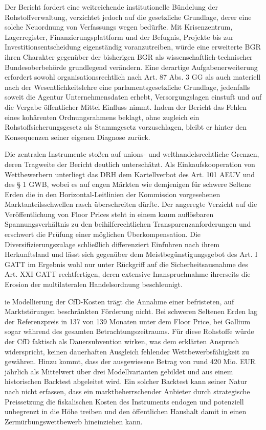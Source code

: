 \documentclass[12pt,a4paper,oneside]{book} %
\begin{document}
{Der Bericht fordert eine weitreichende institutionelle Bündelung der Rohstoffverwaltung, verzichtet jedoch auf die gesetzliche Grundlage, derer eine solche Neuordnung von Verfassungs wegen bedürfte. Mit Krisenzentrum, Lagerregister, Finanzierungsplattform und der Befugnis, Projekte bis zur Investitionsentscheidung eigenständig voranzutreiben, würde eine erweiterte BGR ihren Charakter gegenüber der bisherigen BGR als wissenschaftlich-technischer Bundesoberbehörde grundlegend verändern. Eine derartige Aufgabenerweiterung erfordert sowohl organisationsrechtlich nach Art. 87 Abs. 3 GG als auch materiell nach der Wesentlichkeitslehre eine parlamentsgesetzliche Grundlage, jedenfalls soweit die Agentur Unternehmensdaten erhebt, Versorgungslagen einstuft und auf die Vergabe öffentlicher Mittel Einfluss nimmt. Indem der Bericht das Fehlen eines kohärenten Ordnungsrahmens beklagt, ohne zugleich ein Rohstoffsicherungsgesetz als Stammgesetz vorzuschlagen, bleibt er hinter den Konsequenzen seiner eigenen Diagnose zurück.

Die zentralen Instrumente stoßen auf unions- und welthandelsrechtliche Grenzen, deren Tragweite der Bericht deutlich unterschätzt. Als Einkaufskooperation von Wettbewerbern unterliegt das DRH dem Kartellverbot des Art. 101 AEUV und des § 1 GWB, wobei es auf engen Märkten wie demjenigen für schwere Seltene Erden die in den Horizontal-Leitlinien der Kommission vorgesehenen Marktanteilsschwellen rasch überschreiten dürfte. Der angeregte Verzicht auf die Veröffentlichung von Floor Prices steht in einem kaum auflösbaren Spannungsverhältnis zu den beihilferechtlichen Transparenzanforderungen und erschwert die Prüfung einer möglichen Überkompensation. Die Diversifizierungszulage schließlich differenziert Einfuhren nach ihrem Herkunftsland und lässt sich gegenüber dem Meistbegünstigungsgebot des Art. I GATT im Ergebnis wohl nur unter Rückgriff auf die Sicherheitsausnahme des Art. XXI GATT rechtfertigen, deren extensive Inanspruchnahme ihrerseits die Erosion der multilateralen Handelsordnung beschleunigt.

ie Modellierung der CfD-Kosten trägt die Annahme einer befristeten, auf Marktstörungen beschränkten Förderung nicht. Bei schweren Seltenen Erden lag der Referenzpreis in 137 von 139 Monaten unter dem Floor Price, bei Gallium sogar während des gesamten Betrachtungszeitraums. Für diese Rohstoffe würde der CfD faktisch als Dauersubvention wirken, was dem erklärten Anspruch widerspricht, keinen dauerhaften Ausgleich fehlender Wettbewerbsfähigkeit zu gewähren. Hinzu kommt, dass der ausgewiesene Betrag von rund 420 Mio. EUR jährlich als Mittelwert über drei Modellvarianten gebildet und aus einem historischen Backtest abgeleitet wird. Ein solcher Backtest kann seiner Natur nach nicht erfassen, dass ein marktbeherrschender Anbieter durch strategische Preissetzung die fiskalischen Kosten des Instruments endogen und potenziell unbegrenzt in die Höhe treiben und den öffentlichen Haushalt damit in einen Zermürbungswettbewerb hineinziehen kann.

}
\end{document}
